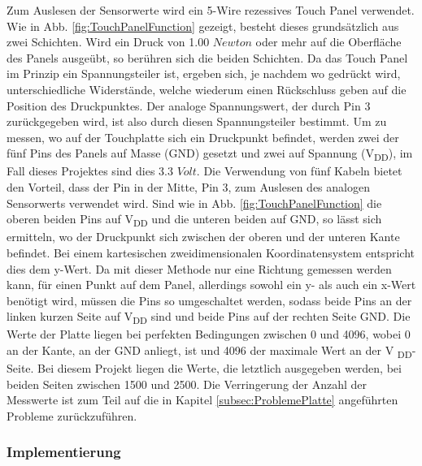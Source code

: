 \documentclass[12pt,a4paper,bibliography=totoc,listof=totoc]{scrartcl}
\begin{document}
Zum Auslesen der Sensorwerte wird ein 5-Wire rezessives Touch Panel verwendet.\newline
Wie in Abb. \ref{fig:TouchPanelFunction} gezeigt, besteht dieses grundsätzlich aus zwei Schichten. Wird ein Druck von 1.00 $Newton$ oder mehr auf die Oberfläche des Panels ausgeübt, so berühren sich die beiden Schichten. Da das Touch Panel im Prinzip ein Spannungsteiler ist, ergeben sich, je nachdem wo gedrückt wird, unterschiedliche Widerstände, welche wiederum einen Rückschluss geben auf die Position des Druckpunktes. Der analoge Spannungswert, der durch Pin 3 zurückgegeben wird, ist also durch diesen Spannungsteiler bestimmt.\newline
Um zu messen, wo auf der Touchplatte sich ein Druckpunkt befindet, werden zwei der fünf Pins des Panels auf Masse (GND) gesetzt und zwei auf Spannung (V\textsubscript{DD}), im Fall dieses Projektes sind dies 3.3 $Volt$. Die Verwendung von fünf Kabeln bietet den Vorteil, dass der Pin in der Mitte, Pin 3, zum Auslesen des analogen Sensorwerts verwendet wird.
Sind wie in Abb. \ref{fig:TouchPanelFunction} die oberen beiden Pins auf V\textsubscript{DD} und die unteren beiden auf GND, so lässt sich ermitteln, wo der Druckpunkt sich zwischen der oberen und der unteren Kante befindet. Bei einem kartesischen zweidimensionalen Koordinatensystem entspricht dies dem y-Wert.
Da mit dieser Methode nur eine Richtung gemessen werden kann, für einen Punkt auf dem Panel, allerdings sowohl ein y- als auch ein x-Wert benötigt wird, müssen die Pins so umgeschaltet werden, sodass beide Pins an der linken kurzen Seite auf V\textsubscript{DD} sind und beide Pins auf der rechten Seite GND.\newline
Die Werte der Platte liegen bei perfekten Bedingungen zwischen  0 und 4096, wobei 0 an der Kante, an der GND anliegt, ist und 4096 der maximale Wert an der V \textsubscript{DD}-Seite. Bei diesem Projekt liegen die Werte, die letztlich ausgegeben werden, bei beiden Seiten zwischen 1500 und 2500. Die Verringerung der Anzahl der Messwerte ist zum Teil auf die in Kapitel \ref{subsec:ProblemePlatte} angeführten Probleme zurückzuführen.

\subsubsection{Implementierung}
\end{document}

